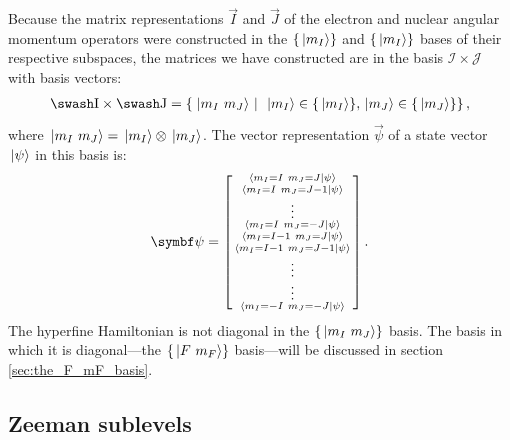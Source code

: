 Because the matrix representations $\vec I$ and $\vec J$ of the electron and nuclear angular momentum operators were constructed in the $\{\ket{m_I}\}$ and $\{\ket{m_I}\}$ bases of their respective subspaces, the matrices we have constructed are in the basis $\mathcal{I}\times\mathcal{J}$ with basis vectors:
\begin{align}
\mathcal{I}\times\mathcal{J} = \left\{\left. \ket{m_I\ m_J} \ \right| \ \ket{m_I} \in \{\ket{m_I}\}, \ket{m_J} \in \{\ket{m_J}\}\right\},
\end{align}
where $\ket{m_I\ m_J} = \ket{m_I} \otimes \ket{m_J}$. The vector representation $\vec\psi$ of a state vector $\ket{\psi}$ in this basis is:
\begin{align}
\vec \psi = \left[\begin{smallmatrix}
\braket{m_I=I\ m_J=J}{\psi}\\
\braket{m_I=I\ m_J=J-1}{\psi}\\
\vdots\\
\braket{m_I=I\ m_J=-J}{\psi}\\
\braket{m_I=I-1\ m_J=J}{\psi}\\
\braket{m_I=I-1\ m_J=J-1}{\psi}\\
\vdots\\
\vdots\\
\braket{m_I=-I\ m_J=-J}{\psi}\\
\end{smallmatrix}\right].
\end{align}
The hyperfine Hamiltonian is not diagonal in the $\{\ket{m_I\ m_J}\}$ basis. The basis in which it is diagonal---the $\{\ket{F\ m_F}\}$ basis---will be discussed in section \ref{sec:the_F_mF_basis}.

\subsection{Zeeman sublevels}

